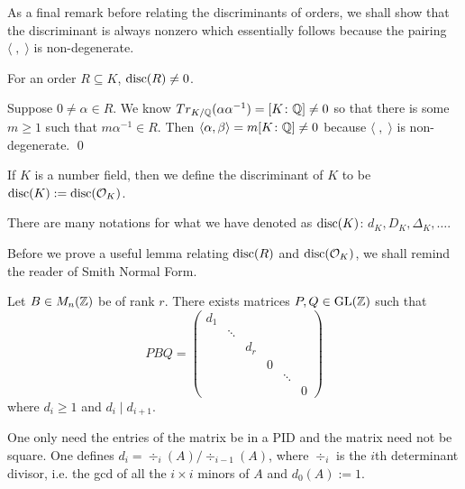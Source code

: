 As a final remark before relating the discriminants of orders, we shall show that the discriminant is always nonzero which essentially follows because the pairing $\langle \;,\; \rangle$ is non-degenerate.


\begin{prop}
For an order $R \subseteq K$, $\operatorname{disc}(R) \neq 0$.
\end{prop}

\pf Suppose $0 \neq \alpha \in R$. We know $Tr_{K/\mathbb{Q}}(\alpha\alpha^{-1})= [K \colon \mathbb{Q}] \neq 0$ so that there is some $m \geq 1$ such that $m \alpha^{-1} \in R$. Then $\langle \alpha, \beta \rangle= m [K \colon \mathbb{Q}] \neq 0$ because $\langle \;,\; \rangle$ is non-degenerate. \qed \pskip


\begin{dfn}
If $K$ is a number field, then we define the discriminant of $K$ to be $\operatorname{disc}(K):= \operatorname{disc}(\mathcal{O}_K)$. 
\end{dfn}


\begin{rem}
There are many notations for what we have denoted as $\operatorname{disc}(K)$: $d_K, D_K, \Delta_K, \ldots$.
\end{rem}


Before we prove a useful lemma relating $\operatorname{disc}(R)$ and $\operatorname{disc}(\mathcal{O}_K)$, we shall remind the reader of Smith Normal Form.


\begin{thm}
Let $B \in M_n(\mathbb{Z})$ be of rank $r$. There exists matrices $P, Q \in \operatorname{GL}(\mathbb{Z})$ such that
	\[
	PBQ=
	\begin{pmatrix}
	 d_1 &  &  &  &  & \\ 
	 &  \ddots &  &  &  & \\ 
	 &  &  d_r &  &  & \\ 
	 &  &  & 0 &  & \\ 
	 &  &  &  & \ddots & \\ 
	 &  &  &  &  & 0
	\end{pmatrix}
	\]
where $d_i \geq 1$ and $d_i \mid d_{i+1}$. 
\end{thm}


\begin{rem}
One only need the entries of the matrix be in a PID and the matrix need not be square. One defines $d_i= \div_i(A) / \div_{i-1}(A)$, where $\div_i$ is the $i$th determinant divisor, i.e. the gcd of all the $i \times i$ minors of $A$ and $d_0(A):= 1$. 
\end{rem}



